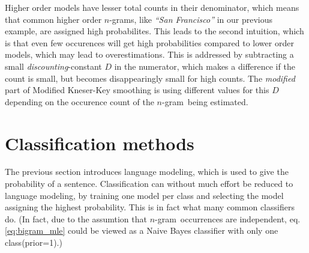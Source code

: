 \documentclass[a4paper,11pt]{kth-mag}
\newcommand{\ngram}{$n$-gram}
\begin{document}
Higher order models have lesser total counts in their denominator, which means that common
higher order \ngram s, like \emph{``San Francisco''} in our previous example, are assigned high probabilites.
This leads to the second intuition, which is that even few occurences will
get high probabilities compared to lower order models, which may lead to overestimations.
This is addressed by subtracting a small \emph{discounting}-constant $D$ in the numerator,
which makes a difference if the count is small, but becomes disappearingly small for high counts.
The \emph{modified} part of Modified Kneser-Key smoothing is using different values for this
$D$ depending on the occurence count of the \ngram~being estimated\cite{chen_goodman}.


\section{Classification methods}
The previous section introduces language modeling, which is used to give the probability of a sentence.
Classification can without much effort be reduced to language modeling, by training one model per class and
selecting the model assigning the highest probability. This is in fact what many common classifiers do.
(In fact, due to the assumtion that \ngram~occurrences are independent, eq. \ref {eq:bigram_mle}
could be viewed as a Naive Bayes classifier with only one class(prior=1).)
\end{document}
